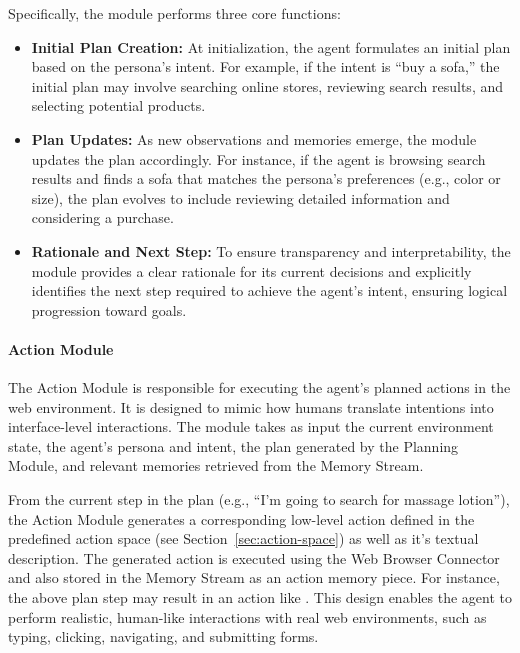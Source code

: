 \documentclass[manuscript,review,anonymous]{acmart}
\begin{document}
Specifically, the module performs three core functions:
\begin{itemize}
    \item \textbf{Initial Plan Creation:} At initialization, the agent formulates an initial plan based on the persona's intent. For example, if the intent is ``buy a sofa,'' the initial plan may involve searching online stores, reviewing search results, and selecting potential products.
    \item \textbf{Plan Updates:} As new observations and memories emerge, the module updates the plan accordingly. For instance, if the agent is browsing search results and finds a sofa that matches the persona's preferences (e.g., color or size), the plan evolves to include reviewing detailed information and considering a purchase.
    \item \textbf{Rationale and Next Step:} To ensure transparency and interpretability, the module provides a clear rationale for its current decisions and explicitly identifies the next step required to achieve the agent's intent, ensuring logical progression toward goals.
\end{itemize}

\paragraph{Action Module}
\label{sec:action-module}

The Action Module is responsible for executing the agent's planned actions in the web environment. It is designed to mimic how humans translate intentions into interface-level interactions. The module takes as input the current environment state, the agent’s persona and intent, the plan generated by the Planning Module, and relevant memories retrieved from the Memory Stream.

From the current step in the plan (e.g., ``I'm going to search for massage lotion''), the Action Module generates a corresponding low-level action defined in the predefined action space (see Section~\ref{sec:action-space}) as well as it's textual description.
The generated action is executed using the Web Browser Connector and also stored in the Memory Stream as an action memory piece.
For instance, the above plan step may result in an action like .
This design enables the agent to perform realistic, human-like interactions with real web environments, such as typing, clicking, navigating, and submitting forms.
\end{document}
